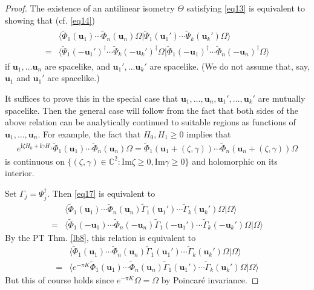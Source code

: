 \documentclass[12pt,b5paper,notitlepage]{article}
\theoremstyle{definition}
\theoremstyle{plain}
\newcommand{\wtd}{\widetilde}
\newcommand{\bk}[1]{\langle {#1}\rangle}
\newcommand{\im}{\mathbf{i}}
\newcommand{\Cbb}{\mathbb C}
\newcommand{\ubf}{\mathbf u}
\newcommand{\Imag}{\mathrm{Im}}
\numberwithin{equation}{section}
\begin{document}
\begin{proof}
The existence of an antilinear isometry $\Theta$ satisfying \eqref{eq13} is equivalent to showing that (cf. \eqref{eq14})
\begin{align*}
\begin{aligned}
&\bk{\wtd\Phi_1(\ubf_1)\cdots\wtd\Phi_n(\ubf_n)\Omega|\wtd\Psi_1(\ubf_1')\cdots\wtd\Psi_k(\ubf_k')\Omega}\\
=&\bk{\wtd\Psi_1(-\ubf_1')^\dagger\cdots\wtd\Psi_k(-\ubf_k')^\dagger\Omega|\wtd\Phi_1(-\ubf_1)^\dagger\cdots\wtd\Phi_n(-\ubf_n)^\dagger\Omega}
\end{aligned}\tag{$\star$}\label{eq17}
\end{align*} 
if $\ubf_1,\dots\ubf_n$ are spacelike, and $\ubf_1',\dots\ubf_k'$ are spacelike. (We do not assume that, say, $\ubf_1$ and $\ubf_1'$ are spacelike.)

It suffices to prove this in the special case that $\ubf_1,\dots,\ubf_n,\ubf_1',\dots,\ubf_k'$ are mutually spacelike. Then the general case will follow from the fact that both sides of the above relation can be analytically continued to suitable regions as functions of $\ubf_1,\dots,\ubf_n$. For example, the fact that $H_0,H_1\geq0$ implies that
\begin{align*}
e^{\im\zeta H_0+\im\gamma H_1}\wtd\Phi_1(\ubf_1)\cdots\wtd\Phi_n(\ubf_n)\Omega=\wtd\Phi_1(\ubf_1+(\zeta,\gamma))\cdots\wtd\Phi_n(\ubf_n+(\zeta,\gamma))\Omega
\end{align*}
is continuous on $\{(\zeta,\gamma)\in\Cbb^2:\Imag\zeta\geq0,\Imag\gamma\geq0\}$ and holomorphic on its interior.

Set $\Gamma_j=\Psi_j^\dagger$. Then \eqref{eq17} is equivalent to
\begin{align*}
&\bk{\wtd\Phi_1(\ubf_1)\cdots\wtd\Phi_n(\ubf_n)\wtd\Gamma_1(\ubf_1')\cdots\wtd\Gamma_k(\ubf_k')\Omega|\Omega}\\
=&\bk{\wtd\Phi_1(-\ubf_1)\cdots\wtd\Phi_n(-\ubf_n)\wtd\Gamma_1(-\ubf_1')\cdots\wtd\Gamma_k(-\ubf_k')\Omega|\Omega}
\end{align*}
By the PT Thm. \ref{lb8}, this relation is equivalent to
\begin{align*}
&\bk{\wtd\Phi_1(\ubf_1)\cdots\wtd\Phi_n(\ubf_n)\wtd\Gamma_1(\ubf_1')\cdots\wtd\Gamma_k(\ubf_k')\Omega|\Omega}\\
=&\bk{e^{-\pi K}\wtd\Phi_1(\ubf_1)\cdots\wtd\Phi_n(\ubf_n)\wtd\Gamma_1(\ubf_1')\cdots\wtd\Gamma_k(\ubf_k')\Omega|\Omega}
\end{align*}
But this of course holds since $e^{-\pi K}\Omega=\Omega$ by Poincar\'e invariance.
\end{proof}
\end{document}
